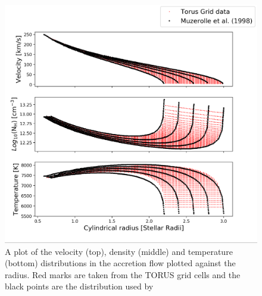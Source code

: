 \documentclass[fleqn,usenatbib]{mnras}
\begin{document}
\begin{figure}
    \centering
    \includegraphics[width=\linewidth,trim={0 1cm 0 0},clip]{figures/density}
    \caption{A plot of the velocity (top), density (middle) and temperature (bottom) distributions in the accretion flow plotted against the radius. Red marks are taken from the TORUS grid cells and the black points are the distribution used by~\citet{1998ApJ...492..743M}}
    \label{fig:density}
\end{figure}
\end{document}
